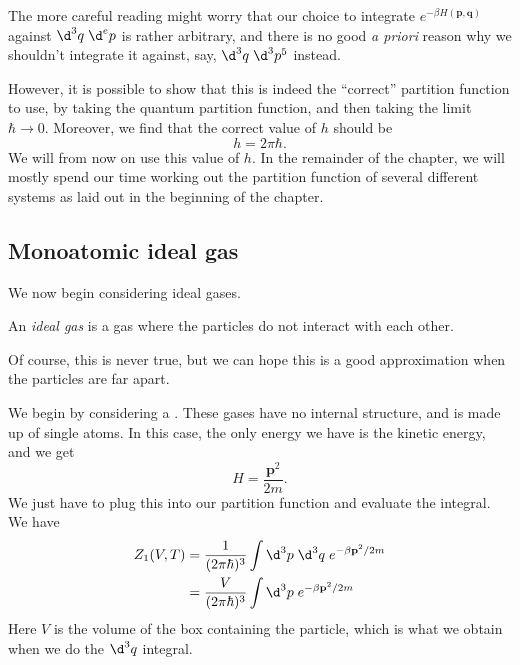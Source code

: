 \documentclass[a4paper]{article}
\begin{document}
The more careful reading might worry that our choice to integrate $e^{-\beta H(\mathbf{p}, \mathbf{q})}$ against $\d^3 q\; \d^e p$ is rather arbitrary, and there is no good \emph{a priori} reason why we shouldn't integrate it against, say, $\d^3 q\; \d^3 p^5$ instead.

However, it is possible to show that this is indeed the ``correct'' partition function to use, by taking the quantum partition function, and then taking the limit $\hbar \to 0$. Moreover, we find that the correct value of $h$ should be
\[
  h = 2\pi \hbar.
\]
We will from now on use this value of $h$. In the remainder of the chapter, we will mostly spend our time working out the partition function of several different systems as laid out in the beginning of the chapter.

\subsection{Monoatomic ideal gas}
We now begin considering ideal gases.
\begin{defi}
  An \emph{ideal gas} is a gas where the particles do not interact with each other.
\end{defi}
Of course, this is never true, but we can hope this is a good approximation when the particles are far apart.

We begin by considering a . These gases have no internal structure, and is made up of single atoms. In this case, the only energy we have is the kinetic energy, and we get
\[
  H = \frac{\mathbf{p}^2}{2m}.
\]
We just have to plug this into our partition function and evaluate the integral. We have
\begin{align*}
  Z_1(V, T) &= \frac{1}{(2\pi \hbar)^3} \int \d^3 p\; \d^3 q\; e^{-\beta \mathbf{p}^2 /2m}\\
  &= \frac{V}{(2\pi \hbar)^3} \int \d^3 p\; e^{-\beta \mathbf{p}^2/2m}
\end{align*}
Here $V$ is the volume of the box containing the particle, which is what we obtain when we do the $\d^3 q$ integral.
\end{document}
